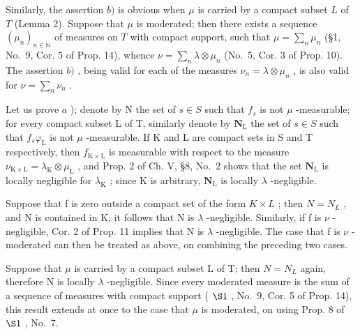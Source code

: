 Similarly, the assertion \(b)\) is obvious when \(\mu\) is carried by a compact subset \(L\) of \(T\) (Lemma 2). Suppose that \(\mu\) is moderated; then there exists a sequence \((\mu_n)_{n \in \mathbb{N}}\) of measures on \(T\) with compact support, such that \(\mu = \sum_{n} \mu_n\) (§1, No.~9, Cor. 5 of Prop. 14), whence \(\nu = \sum_{n} \lambda \otimes \mu_n\) (No.~5, Cor. 3 of Prop. 10). The assertion \(b)\) , being valid for each of the measures \(\nu_n = \lambda \otimes \mu_n\) , is also valid for \(\nu = \sum_{n} \nu_n\) .

Let us prove \(a\) ); denote by N the set of \(s \in S\) such that \(f_s\) is not \(\mu\) -measurable; for every compact subset L of T, similarly denote by \(\mathbf{N}_{\mathrm{L}}\) the set of \(s \in S\) such that \(f_s \varphi_{\mathrm{L}}\) is not \(\mu\) -measurable. If K and L are compact sets in S and T respectively, then \(f_{\mathrm{K} \times \mathrm{L}}\) is measurable with respect to the measure \(\nu_{\mathrm{K} \times \mathrm{L}} = \lambda_{\mathrm{K}} \otimes \mu_{\mathrm{L}}\) , and Prop. 2 of Ch. V, §8, No.~2 shows that the set \(\mathbf{N}_{\mathrm{L}}\) is locally negligible for \(\lambda_{\mathrm{K}}\) ; since K is arbitrary, \(\mathbf{N}_{\mathrm{L}}\) is locally \(\lambda\) -negligible.

Suppose that f is zero outside a compact set of the form \(K \times L\) ; then \(N = N_{L}\) , and N is contained in K; it follows that N is \(\lambda\) -negligible. Similarly, if f is \(\nu\) -negligible, Cor. 2 of Prop. 11 implies that N is \(\lambda\) -negligible. The case that f is \(\nu\) -moderated can then be treated as above, on combining the preceding two cases.

Suppose that \(\mu\) is carried by a compact subset L of T; then \(N = N_{L}\) again, therefore N is locally \(\lambda\) -negligible. Since every moderated measure is the sum of a sequence of measures with compact support ( \(\S1\) , No.~9, Cor. 5 of Prop. 14), this result extends at once to the case that \(\mu\) is moderated, on using Prop. 8 of \(\S1\) , No.~7.

